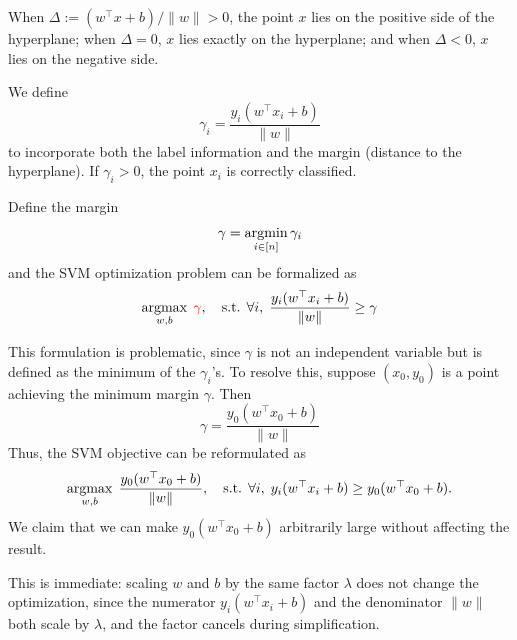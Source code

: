 \documentclass[../main]{subfiles}
\begin{document}
When $\Delta:={(w^\top x + b)}/{\|w\|} > 0$, the point $x$ lies on the positive side of the hyperplane;  
when $\Delta = 0$, $x$ lies exactly on the hyperplane;  
and when $\Delta < 0$, $x$ lies on the negative side.  

We define
\begin{equation}
    \gamma_i = \frac{y_i(w^\top x_i + b)}{\|w\|}
\end{equation}
to incorporate both the label information and the margin (distance to the hyperplane).  
If $\gamma_i > 0$, the point $x_i$ is correctly classified.  

Define the margin
\begin{equation}
    \gamma = \mathop{\mathrm{argmin}}_{i \in [n]} \gamma_i
\end{equation}
and the SVM optimization problem can be formalized as
\begin{equation}
    \mathop{\mathrm{argmax}}_{w,b} \; {\color{red}{\gamma}}, 
    \quad \text{s.t. } \forall i, \; \frac{y_i (w^\top x_i + b)}{\|w\|} \geq \gamma
\end{equation}

This formulation is problematic, since $\gamma$ is not an independent variable but is defined as the minimum of the $\gamma_i$'s. 
To resolve this, suppose $(x_0, y_0)$ is a point achieving the minimum margin $\gamma$.  
Then
\begin{equation}
    \gamma = \frac{y_0 (w^\top x_0 + b)}{\|w\|}
\end{equation}
Thus, the SVM objective can be reformulated as
\begin{equation}
    \mathop{\mathrm{argmax}}_{w,b} \; \frac{y_0 (w^\top x_0 + b)}{\|w\|}, 
    \quad \text{s.t. } \forall i, \; y_i (w^\top x_i + b) \geq y_0 (w^\top x_0 + b).
\end{equation}
We claim that we can make $y_0(w^\top x_0 + b)$ arbitrarily large without affecting the result.

\begin{remark}
    This is immediate: scaling $w$ and $b$ by the same factor $\lambda$ does not change the optimization, since the numerator $y_i(w^\top x_i + b)$ and the denominator $\|w\|$ both scale by $\lambda$, and the factor cancels during simplification.
\end{remark}
\end{document}
